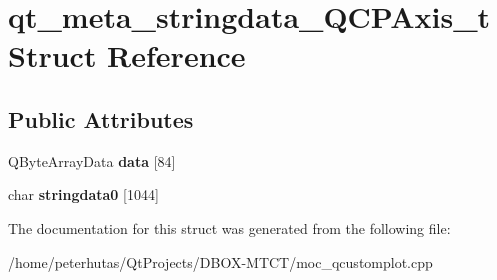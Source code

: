 \hypertarget{structqt__meta__stringdata___q_c_p_axis__t}{}\section{qt\+\_\+meta\+\_\+stringdata\+\_\+\+Q\+C\+P\+Axis\+\_\+t Struct Reference}
\label{structqt__meta__stringdata___q_c_p_axis__t}
\subsection*{Public Attributes}
\begin{DoxyCompactItemize}
\item 
\mbox{\label{structqt__meta__stringdata___q_c_p_axis__t_ad6e7d43321d1d29667d8a964e8b94b03}} 
Q\+Byte\+Array\+Data {\bfseries data} \mbox{[}84\mbox{]}
\item 
\mbox{\label{structqt__meta__stringdata___q_c_p_axis__t_a69e367a936d5d819080b35c76fe96c11}} 
char {\bfseries stringdata0} \mbox{[}1044\mbox{]}
\end{DoxyCompactItemize}


The documentation for this struct was generated from the following file\+:\begin{DoxyCompactItemize}
\item 
/home/peterhutas/\+Qt\+Projects/\+D\+B\+O\+X-\/\+M\+T\+C\+T/moc\+\_\+qcustomplot.\+cpp\end{DoxyCompactItemize}
